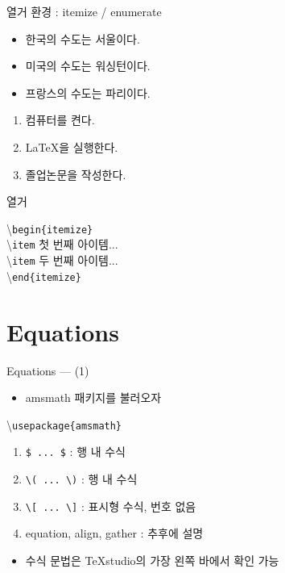 \documentclass[12pt]{gshs_lecture}
\newenvironment{codeblock}[1]{
	\begin{block}{#1}
		\setstretch{1.0}
		\begin{small}
}{
		\end{small}
	\end{block}
}
\begin{document}
\begin{frame}[t]{열거 환경 : itemize / enumerate}
	\begin{itemize}
		\item 한국의 수도는 서울이다.
		\item 미국의 수도는 워싱턴이다.
		\item 프랑스의 수도는 파리이다.
	\end{itemize}
	\begin{enumerate}
		\item 컴퓨터를 켠다.
		\item \LaTeX 을 실행한다.
		\item 졸업논문을 작성한다.
	\end{enumerate}

	\begin{codeblock}{열거}
		\textbackslash \texttt{begin\{itemize\}}\\
		\hspace{6mm} \textbackslash \texttt{item} 첫 번째 아이템...\\
		\hspace{6mm} \textbackslash \texttt{item} 두 번째 아이템...\\
		\textbackslash \texttt{end\{itemize\}}
	\end{codeblock}
\end{frame}

\section{Equations}

\begin{frame}[t]{Equations --- (1)}
	
	\begin{itemize}
		\item amsmath 패키지를 불러오자
	\end{itemize}
	\textbackslash\texttt{usepackage\{amsmath\}}
	\vskip 1pc
	
	\begin{enumerate}
		\item \texttt{\$ ... \$} : 행 내 수식
		\item \texttt{\textbackslash( ... \textbackslash)} : 행 내 수식
		\item \texttt{\textbackslash[ ... \textbackslash]} : 표시형 수식, 번호 없음
		\item equation, align, gather : 추후에 설명
	\end{enumerate}
	
	\begin{itemize}
		\item 수식 문법은 TeXstudio의 가장 왼쪽 바에서 확인 가능
	\end{itemize}
	
\end{frame}
\end{document}
